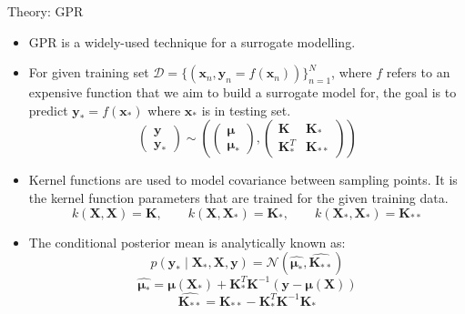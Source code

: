 \begin{frame} {Theory: GPR}

  \begin{itemize}
  \item GPR is a widely-used technique for a surrogate modelling.
  \item For given training set $\mathcal{D} = \{(\mathbf{x}_n, \mathbf{y}_n=f(\mathbf{x}_n))\}^N_{n=1}$, where $f$ refers to an expensive function that we aim to build a surrogate model for, the goal is to predict $\mathbf{y}_* = f(\mathbf{x}_*)$ where $\mathbf{x}_*$ is in testing set.
  \[\left(\begin{matrix}
    \mathbf{y} \\ \mathbf{y}_*
  \end{matrix}\right) \sim \left(\left(\begin{matrix}
    \boldsymbol\mu \\ \boldsymbol\mu_*
  \end{matrix}\right), \left(\begin{matrix}
    \mathbf{K} & \mathbf{K}_* \\ \mathbf{K}^T_* & \mathbf{K}_{**}
  \end{matrix}\right)\right)\]
  \item Kernel functions are used to model covariance between sampling points. It is the kernel function parameters that are trained for the given training data.
  \[k(\mathbf{X}, \mathbf{X}) = \mathbf{K}, \qquad k(\mathbf{X}, \mathbf{X}_*) = \mathbf{K}_*, \qquad k(\mathbf{X}_*, \mathbf{X}_*) = \mathbf{K}_{**}\]
  \item The conditional posterior mean is analytically known as:
  \[p(\mathbf{y}_* \mid \mathbf{X}_*, \mathbf{X}, \mathbf{y}) = \mathcal{N}(\hat{\boldsymbol{\mu}_*}, \hat{\mathbf{K}_{**}})\]
  \[\hat{\boldsymbol{\mu}_*} = \boldsymbol{\mu}(\mathbf{X}_*) + \mathbf{K}^T_*\mathbf{K}^{-1}(\mathbf{y}-\boldsymbol{\mu}(\mathbf{X}))\]
  \[\hat{\mathbf{K}_{**}} = \mathbf{K}_{**} - \mathbf{K}^T_{*}\mathbf{K}^{-1}\mathbf{K}_{*}\]
\end{itemize}

\end{frame}


